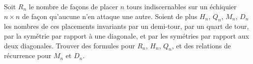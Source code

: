 Soit $R_n$ le nombre de façons de placer $n$ tours indiscernables sur un échiquier $n \times n$ de façon qu'aucune n'en attaque une autre. Soient de plus $H_n$, $Q_n$, $M_n$, $D_n$ les nombres de ces placements invariants par un demi-tour, par un quart de tour, par la symétrie par rapport à une diagonale, et par les symétries par rapport aux deux diagonales. Trouver des formules pour $R_n$, $H_n$, $Q_n$, et des relations de récurrence pour $M_n$ et $D_n$.
